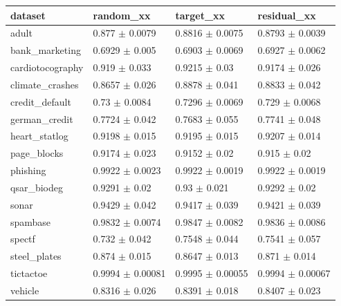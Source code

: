 \begin{tabular}{llll}
\toprule
dataset & random\_xx & target\_xx & residual\_xx \\
\midrule
adult & 0.877 $\pm$ 0.0079 & 0.8816 $\pm$ 0.0075 & 0.8793 $\pm$ 0.0039 \\
bank\_marketing & 0.6929 $\pm$ 0.005 & 0.6903 $\pm$ 0.0069 & 0.6927 $\pm$ 0.0062 \\
cardiotocography & 0.919 $\pm$ 0.033 & 0.9215 $\pm$ 0.03 & 0.9174 $\pm$ 0.026 \\
climate\_crashes & 0.8657 $\pm$ 0.026 & 0.8878 $\pm$ 0.041 & 0.8833 $\pm$ 0.042 \\
credit\_default & 0.73 $\pm$ 0.0084 & 0.7296 $\pm$ 0.0069 & 0.729 $\pm$ 0.0068 \\
german\_credit & 0.7724 $\pm$ 0.042 & 0.7683 $\pm$ 0.055 & 0.7741 $\pm$ 0.048 \\
heart\_statlog & 0.9198 $\pm$ 0.015 & 0.9195 $\pm$ 0.015 & 0.9207 $\pm$ 0.014 \\
page\_blocks & 0.9174 $\pm$ 0.023 & 0.9152 $\pm$ 0.02 & 0.915 $\pm$ 0.02 \\
phishing & 0.9922 $\pm$ 0.0023 & 0.9922 $\pm$ 0.0019 & 0.9922 $\pm$ 0.0019 \\
qsar\_biodeg & 0.9291 $\pm$ 0.02 & 0.93 $\pm$ 0.021 & 0.9292 $\pm$ 0.02 \\
sonar & 0.9429 $\pm$ 0.042 & 0.9417 $\pm$ 0.039 & 0.9421 $\pm$ 0.039 \\
spambase & 0.9832 $\pm$ 0.0074 & 0.9847 $\pm$ 0.0082 & 0.9836 $\pm$ 0.0086 \\
spectf & 0.732 $\pm$ 0.042 & 0.7548 $\pm$ 0.044 & 0.7541 $\pm$ 0.057 \\
steel\_plates & 0.874 $\pm$ 0.015 & 0.8647 $\pm$ 0.013 & 0.871 $\pm$ 0.014 \\
tictactoe & 0.9994 $\pm$ 0.00081 & 0.9995 $\pm$ 0.00055 & 0.9994 $\pm$ 0.00067 \\
vehicle & 0.8316 $\pm$ 0.026 & 0.8391 $\pm$ 0.018 & 0.8407 $\pm$ 0.023 \\
\bottomrule
\end{tabular}
